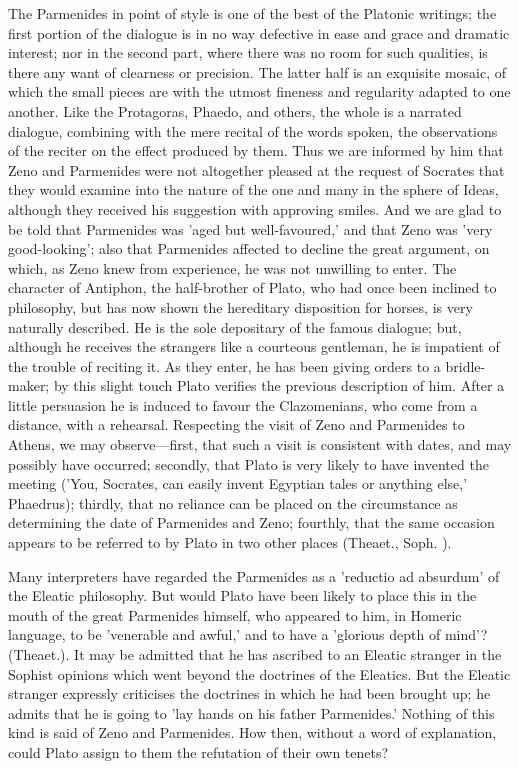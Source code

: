 \documentclass[11pt,letter]{article}
\begin{document}
\par  The Parmenides in point of style is one of the best of the Platonic writings; the first portion of the dialogue is in no way defective in ease and grace and dramatic interest; nor in the second part, where there was no room for such qualities, is there any want of clearness or precision. The latter half is an exquisite mosaic, of which the small pieces are with the utmost fineness and regularity adapted to one another. Like the Protagoras, Phaedo, and others, the whole is a narrated dialogue, combining with the mere recital of the words spoken, the observations of the reciter on the effect produced by them. Thus we are informed by him that Zeno and Parmenides were not altogether pleased at the request of Socrates that they would examine into the nature of the one and many in the sphere of Ideas, although they received his suggestion with approving smiles. And we are glad to be told that Parmenides was 'aged but well-favoured,' and that Zeno was 'very good-looking'; also that Parmenides affected to decline the great argument, on which, as Zeno knew from experience, he was not unwilling to enter. The character of Antiphon, the half-brother of Plato, who had once been inclined to philosophy, but has now shown the hereditary disposition for horses, is very naturally described. He is the sole depositary of the famous dialogue; but, although he receives the strangers like a courteous gentleman, he is impatient of the trouble of reciting it. As they enter, he has been giving orders to a bridle-maker; by this slight touch Plato verifies the previous description of him. After a little persuasion he is induced to favour the Clazomenians, who come from a distance, with a rehearsal. Respecting the visit of Zeno and Parmenides to Athens, we may observe—first, that such a visit is consistent with dates, and may possibly have occurred; secondly, that Plato is very likely to have invented the meeting ('You, Socrates, can easily invent Egyptian tales or anything else,' Phaedrus); thirdly, that no reliance can be placed on the circumstance as determining the date of Parmenides and Zeno; fourthly, that the same occasion appears to be referred to by Plato in two other places (Theaet., Soph. ).

\par  Many interpreters have regarded the Parmenides as a 'reductio ad absurdum' of the Eleatic philosophy. But would Plato have been likely to place this in the mouth of the great Parmenides himself, who appeared to him, in Homeric language, to be 'venerable and awful,' and to have a 'glorious depth of mind'? (Theaet.). It may be admitted that he has ascribed to an Eleatic stranger in the Sophist opinions which went beyond the doctrines of the Eleatics. But the Eleatic stranger expressly criticises the doctrines in which he had been brought up; he admits that he is going to 'lay hands on his father Parmenides.' Nothing of this kind is said of Zeno and Parmenides. How then, without a word of explanation, could Plato assign to them the refutation of their own tenets?
\end{document}

